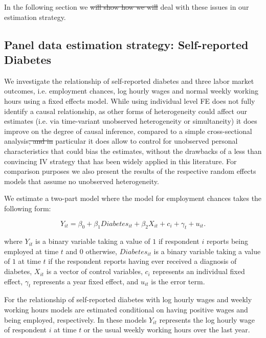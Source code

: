 \documentclass[12pt,english,british]{article}
\providecommand{\DIFaddtex}[1]{{\protect\color{blue}\uwave{#1}}} %
\providecommand{\DIFdeltex}[1]{{\protect\color{red}\sout{#1}}}                      %
\providecommand{\DIFaddbegin}{} %
\providecommand{\DIFaddend}{} %
\providecommand{\DIFdelbegin}{} %
\providecommand{\DIFdelend}{} %
\providecommand{\DIFadd}[1]{\texorpdfstring{\DIFaddtex{#1}}{#1}} %
\providecommand{\DIFdel}[1]{\texorpdfstring{\DIFdeltex{#1}}{}} %
\begin{document}
In the following section we \DIFdelbegin \DIFdel{will show how we will }\DIFdelend \DIFaddbegin \DIFadd{describe how we }\DIFaddend deal with these issues in our estimation strategy.


\subsection{Panel data estimation strategy: Self-reported Diabetes}

We investigate the relationship of self-reported diabetes and three
labor market outcomes, i.e. employment chances, log hourly wages
and normal weekly working hours using a fixed effects model. While using individual level \ac{FE} does not fully
identify a causal relationship, as other forms of heterogeneity could
affect our estimates (i.e. via time-variant unobserved heterogeneity
or simultaneity) it does improve on the degree of causal inference,
compared to a simple cross-sectional analysis\DIFdelbegin \DIFdel{, and in }\DIFdelend \DIFaddbegin \DIFadd{. In }\DIFaddend particular it
does allow to control for unobserved personal characteristics that
could bias the estimates, without the drawbacks of a less than convincing
\ac{IV} strategy that has been widely applied in this literature. 
For comparison purposes we also present the results of the respective random effects models that assume no unobserved heterogeneity.

We estimate a two-part model where the model for employment chances
takes the following form:

\noindent 
\begin{equation}
Y_{it}=\beta_{0}+\beta_{1}Diabetes_{it}+\beta_{2}X_{it}+c_{i}+\gamma_{t}+u_{it}.\label{eq:employed}
\end{equation}


where $Y_{it}$ is a binary variable taking a value of $1$ if respondent
$i$ reports being employed at time $t$ and $0$ otherwise, $Diabetes_{it}$
is a binary variable taking a value of $1$ at time $t$ if the respondent
reports having ever received a diagnosis of diabetes, $X_{it}$ is
a vector of control variables, $c_{i}$ represents an individual fixed
effect, $\gamma_{t}$ represents a year fixed effect, and $u_{it}$
is the error term.

For the relationship of self-reported diabetes with log hourly wages
and weekly working hours \DIFaddbegin \DIFadd{our empirical }\DIFaddend models are estimated conditional on having positive wages and being
employed, respectively. In these models $Y_{it}$ represents the log hourly wage
of respondent $i$ at time $t$ or the usual weekly working hours
over the last year.
\end{document}
